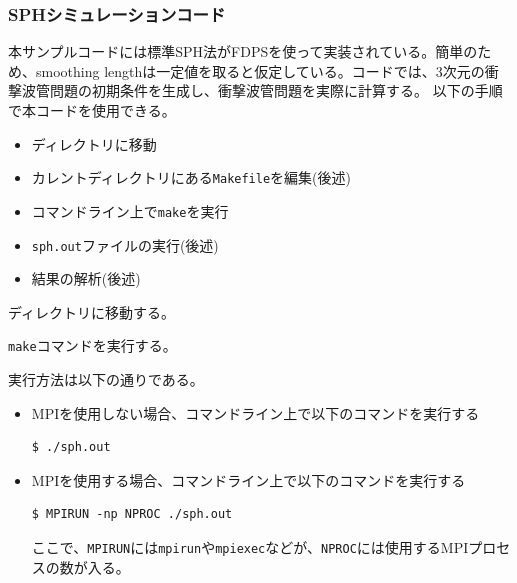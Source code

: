 \subsubsection{SPHシミュレーションコード}
\label{subsubsec:usage_of_sample_codes:sph}
本サンプルコードには標準SPH法がFDPSを使って実装されている。簡単のため、smoothing lengthは一定値を取ると仮定している。コードでは、3次元の衝撃波管問題の初期条件を生成し、衝撃波管問題を実際に計算する。
以下の手順で本コードを使用できる。
\begin{itemize}
\item ディレクトリ\dirNameSPHSample に移動
\item カレントディレクトリにある\texttt{Makefile}を編集(後述)
\item コマンドライン上で\texttt{make}を実行
\item \texttt{sph.out}ファイルの実行(後述)
\item 結果の解析(後述)
\end{itemize}
ディレクトリ\dirNameSPHSample に移動する。

\texttt{make}コマンドを実行する。

実行方法は以下の通りである。
\begin{itemize}
\item MPIを使用しない場合、コマンドライン上で以下のコマンドを実行する
\begin{screen}
\begin{verbatim}
$ ./sph.out
\end{verbatim}
\end{screen}
  
\item MPIを使用する場合、コマンドライン上で以下のコマンドを実行する
\begin{screen}
\begin{verbatim}
$ MPIRUN -np NPROC ./sph.out
\end{verbatim}
\end{screen}
ここで、\texttt{MPIRUN}には\texttt{mpirun}や\texttt{mpiexec}などが、\texttt{NPROC}には使用するMPIプロセスの数が入る。
\end{itemize}

